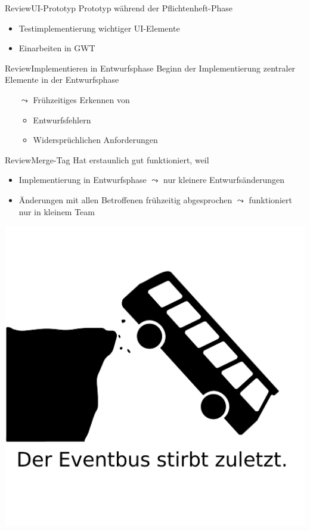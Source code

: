 \documentclass[10pt]{beamer}
\begin{document}
\begin{frame}{Review}{UI-Prototyp}
Prototyp während der Pflichtenheft-Phase
	\begin{itemize}
		\item Testimplementierung wichtiger UI-Elemente
		\item Einarbeiten in GWT
	\end{itemize}
\end{frame}

\begin{frame}{Review}{Implementieren in Entwurfsphase}
Beginn der Implementierung zentraler Elemente in der Entwurfsphase 
	\begin{itemize}
		\item[$\leadsto$] Frühzeitiges Erkennen von 
		\begin{itemize}
			\item Entwurfsfehlern
			\item Widersprüchlichen Anforderungen
		\end{itemize}
	\end{itemize}
\end{frame}

\begin{frame}{Review}{Merge-Tag}
Hat erstaunlich gut funktioniert, weil
	\begin{itemize}
		\item Implementierung in Entwurfsphase $\leadsto$ nur kleinere Entwurfsänderungen %
		\item Änderungen mit allen Betroffenen frühzeitig abgesprochen $\leadsto$ funktioniert nur in kleinem Team
	\end{itemize}
\end{frame}

{\1
\begin{frame}
  \includegraphics[width = \textwidth]{img/eventbus}
\end{frame}}
\end{document}
